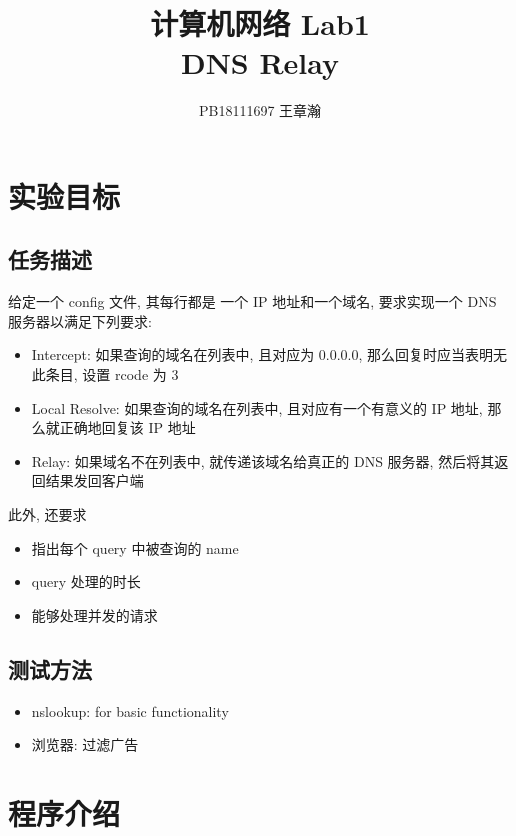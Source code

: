 \documentclass[UTF8]{article}
\title{计算机网络 Lab1\\\Large DNS Relay}
\author{PB18111697 王章瀚}
\begin{document}
\maketitle
\tableofcontents
\newpage
\section{实验目标}
\subsection{任务描述}
\noindent 给定一个 config 文件, 其每行都是 一个 IP 地址和一个域名, 要求实现一个 DNS 服务器以满足下列要求:
\begin{itemize}
\item Intercept: 如果查询的域名在列表中, 且对应为 0.0.0.0, 那么回复时应当表明无此条目, 设置 rcode 为 3
\item Local Resolve: 如果查询的域名在列表中, 且对应有一个有意义的 IP 地址, 那么就正确地回复该 IP 地址
\item Relay: 如果域名不在列表中, 就传递该域名给真正的 DNS 服务器, 然后将其返回结果发回客户端
\end{itemize}
此外, 还要求
\begin{itemize}
\item 指出每个 query 中被查询的 name
\item query 处理的时长
\item 能够处理并发的请求
\end{itemize}

\subsection{测试方法}
\begin{itemize}
\item nslookup: for basic functionality
\item 浏览器: 过滤广告
\end{itemize}

\section{程序介绍}
\end{document}
